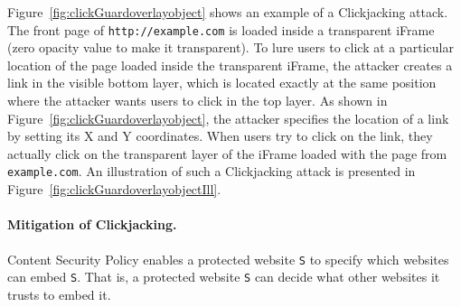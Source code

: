 Figure~\ref{fig:clickGuardoverlayobject} shows an example of a
Clickjacking attack. The front page of {\tt http://example.com} is
loaded inside a transparent iFrame (zero opacity value to make it
transparent). To lure users to click at a particular location of the
page loaded inside the transparent iFrame, the attacker creates a link
in the visible bottom layer, which is located exactly at the same
position where the attacker wants users to click in the top layer. As
shown in Figure~\ref{fig:clickGuardoverlayobject}, the attacker
specifies the location of a link by setting its X and Y
coordinates. When users try to click on the link, they actually click
on the transparent layer of the iFrame loaded with the page from {\tt
  example.com}. An illustration of such a Clickjacking attack is
presented in Figure~\ref{fig:clickGuardoverlayobjectIll}.


\paragraph{\bf Mitigation of Clickjacking.}
Content Security Policy enables a protected website {\tt S} to specify
which websites can embed {\tt S}. That is, a protected website {\tt S}
can decide what other websites it trusts to embed it.
